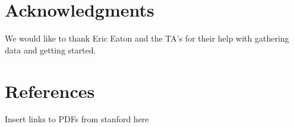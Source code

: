 \documentclass{article}
\begin{document}
\section*{Acknowledgments}

We would like to thank Eric Eaton and the TA's for their help with gathering data and getting started.

\section*{References}

Insert links to PDFs from stanford here




\end{document}
